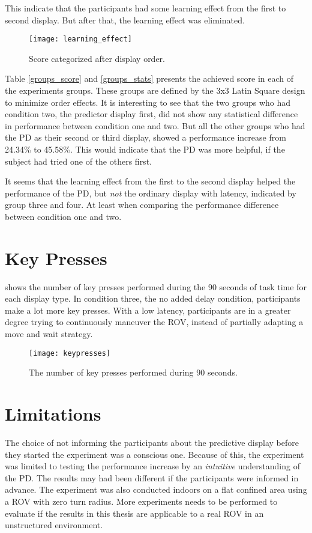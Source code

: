 This indicate that the participants had some learning effect from the first to second display. But after that, the learning effect was eliminated.

\begin{figure}[h!]
    \centering
    \texttt{[image: learning\_effect]}
    \caption{Score categorized after display order.}
    \label{learning_effect}
\end{figure}

\clearpage
Table \ref{groups_score} and \ref{groups_stats} presents the achieved score in each of the experiments groups. These groups are defined by the 3x3 Latin Square design to minimize order effects. It is interesting to see that the two groups who had condition two, the predictor display first, did not show any statistical difference in performance between condition one and two. But all the other groups who had the PD as their second or third display, showed a performance increase from 24.34\% to 45.58\%. This would indicate that the PD was more helpful, if the subject had tried one of the others first.

It seems that the learning effect from the first to the second display helped the performance of the PD, but \emph{not} the ordinary display with latency, indicated by group three and four. At least when comparing the performance  difference between condition one and two.




\clearpage
\section{Key Presses}

 shows the number of key presses performed during the 90 seconds of task time for each display type. In condition three, the no added delay condition, participants make a lot more key presses. With a low latency, participants are in a greater degree trying to continuously maneuver the ROV, instead of partially adapting a move and wait strategy.

\begin{figure}[h!]
    \centering
    \texttt{[image: keypresses]}
    \caption{The number of key presses performed during 90 seconds.}
    \label{keypresses}
    \vspace{-5mm}
\end{figure}

\section{Limitations}

The choice of not informing the participants about the predictive display before they started the experiment was a conscious one. Because of this, the experiment was limited to testing the performance increase by an \emph{intuitive} understanding of the PD. The results may had been different if the participants were informed in advance. The experiment was also conducted indoors on a flat confined area using a ROV with zero turn radius. More experiments needs to be performed to evaluate if the results in this thesis are applicable to a real ROV in an unstructured environment.
